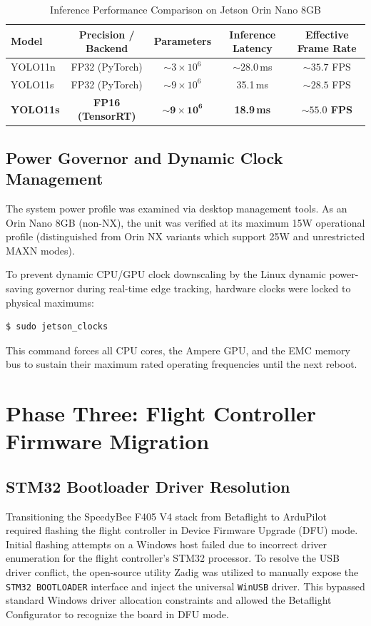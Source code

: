 \documentclass[11pt,a4paper]{article}
\begin{document}
\begin{table}[h]
\centering
\caption{Inference Performance Comparison on Jetson Orin Nano 8GB} 
\begin{tabular}{@{}lcccc@{}}
\toprule
\textbf{Model} & \textbf{Precision / Backend} & \textbf{Parameters} & \textbf{Inference Latency} & \textbf{Effective Frame Rate} \\ \midrule
YOLO11n & FP32 (PyTorch) & $\sim 3\times 10^6$ & $\sim 28.0$\,ms & $\sim 35.7$ FPS \\
YOLO11s & FP32 (PyTorch) & $\sim 9\times 10^6$ & 35.1\,ms & $\sim 28.5$ FPS \\
\textbf{YOLO11s} & \textbf{FP16 (TensorRT)} & $\mathbf{\sim 9\times 10^6}$ & \textbf{18.9\,ms} & \textbf{$\sim 55.0$ FPS} \\ \bottomrule
\end{tabular}
\end{table}

\subsection{Power Governor and Dynamic Clock Management} 
The system power profile was examined via desktop management tools. As an Orin Nano 8GB (non-NX), the unit was verified at its maximum 15W operational profile (distinguished from Orin NX variants which support 25W and unrestricted MAXN modes). 

To prevent dynamic CPU/GPU clock downscaling by the Linux dynamic power-saving governor during real-time edge tracking, hardware clocks were locked to physical maximums: 
\begin{lstlisting}[language=bash]
$ sudo jetson_clocks
\end{lstlisting}
This command forces all CPU cores, the Ampere GPU, and the EMC memory bus to sustain their maximum rated operating frequencies until the next reboot.

\newpage
\section{Phase Three: Flight Controller Firmware Migration}

\subsection{STM32 Bootloader Driver Resolution}
Transitioning the SpeedyBee F405 V4 stack from Betaflight to ArduPilot required flashing the flight controller in Device Firmware Upgrade (DFU) mode. Initial flashing attempts on a Windows host failed due to incorrect driver enumeration for the flight controller's STM32 processor. To resolve the USB driver conflict, the open-source utility Zadig was utilized to manually expose the \texttt{STM32 BOOTLOADER} interface and inject the universal \texttt{WinUSB} driver. This bypassed standard Windows driver allocation constraints and allowed the Betaflight Configurator to recognize the board in DFU mode.
\end{document}
